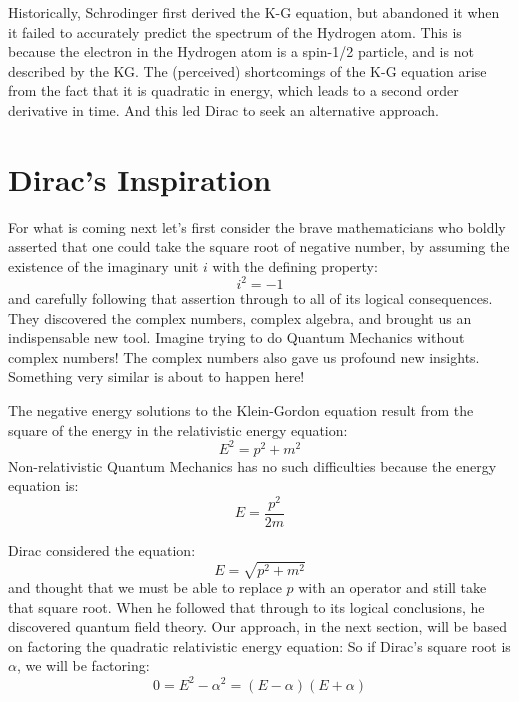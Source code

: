 \documentclass[12pt]{article}
\begin{document}
Historically, Schrodinger first derived the K-G equation, but
abandoned it when it failed to accurately predict the spectrum of the
Hydrogen atom.  This is because the electron in the Hydrogen atom is a
spin-1/2 particle, and is not described by the KG.  The (perceived)
shortcomings of the K-G equation arise from the fact that it is
quadratic in energy, which leads to a second order derivative in time.
And this led Dirac to seek an alternative approach.

\section{Dirac's Inspiration}

For what is coming next let's first consider the brave mathematicians who boldly asserted that one could take the square root of negative number, by assuming the existence of the imaginary unit $i$ with the defining property:
$$i^2 = -1$$
and carefully following that assertion through to all of its logical consequences.  They discovered the complex numbers, complex algebra, and brought us an indispensable new tool.  Imagine trying to do Quantum Mechanics without complex numbers!  The complex numbers also gave us profound new insights.  Something very similar is about to happen here!

The negative energy solutions to the Klein-Gordon equation result from
the square of the energy in the relativistic energy equation:
$$E^2 = p^2 + m^2$$
Non-relativistic Quantum Mechanics has no such difficulties because the energy equation is:
$$E = \frac{p^2}{2m}$$

Dirac considered the equation:
$$E = \sqrt{p^2 + m^2}$$
and thought that we must be able to replace $p$ with an operator and
still take that square root.  When he followed that through to its
logical conclusions, he discovered quantum field theory.  Our
approach, in the next section, will be based on factoring the
quadratic relativistic energy equation: So if Dirac's square root is
$\alpha$, we will be factoring:
$$0 = E^2 - \alpha^2 = (E-\alpha)(E+\alpha)$$
\end{document}
